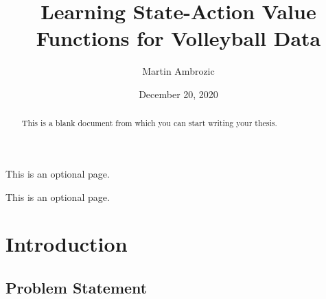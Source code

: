 \documentclass{sfuthesis}
\title{Learning State-Action Value Functions for Volleyball Data}
\author{Martin Ambrozic}
\date{December 20, 2020}
\begin{document}
	
	\frontmatter
	\maketitle{}
	\makecommittee{}
	
	\begin{abstract}
		This is a blank document from which you can start writing your thesis.
	\end{abstract}
	
	
	\begin{dedication}
		This is an optional page.
	\end{dedication}
	
	
	\begin{acknowledgements}
		This is an optional page.
	\end{acknowledgements}
	
	\tableofcontents%
	\clearpage
	
	\listoftables%
	\clearpage
	
	\listoffigures%
	\clearpage
	
	
	
	
	
	
	\mainmatter%
	
	
	\chapter{Introduction}
	\section{Problem Statement}
\end{document}
